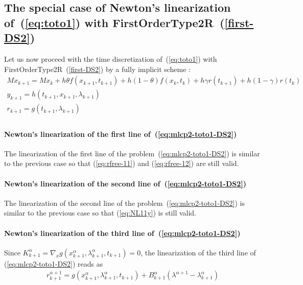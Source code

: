 

\subsection{The special case of Newton's linearization of~(\ref{eq:toto1}) with FirstOrderType2R~(\ref{first-DS2})} 


Let us now proceed with the time discretization of~(\ref{eq:toto1}) with FirstOrderType2R~(\ref{first-DS2})  by a fully implicit scheme : 
\begin{equation}
  \begin{array}{l}
    \label{eq:mlcp2-toto1-DS2}
     M x_{k+1} = M x_{k} +h\theta f(x_{k+1},t_{k+1})+h(1-\theta) f(x_k,t_k) + h \gamma r(t_{k+1})
     + h(1-\gamma)r(t_k)  \\[2mm]
     y_{k+1} =  h(t_{k+1},x_{k+1},\lambda _{k+1}) \\[2mm]
     r_{k+1} = g(t_{k+1},\lambda_{k+1})\\[2mm]
  \end{array}
\end{equation}


 \paragraph{Newton's linearization of the first line of~(\ref{eq:mlcp2-toto1-DS2})} The linearization of the first line of the  problem~(\ref{eq:mlcp2-toto1-DS2}) is similar to the previous case so that (\ref{eq:rfree-11}) and (\ref{eq:rfree-12}) are still valid.


 \paragraph{Newton's linearization of the second  line of~(\ref{eq:mlcp2-toto1-DS2})} The linearization of the second line of the  problem~(\ref{eq:mlcp2-toto1-DS2}) is similar to the previous case so that (\ref{eq:NL11y}) is still valid.

 \paragraph{Newton's linearization of the third  line of~(\ref{eq:mlcp2-toto1-DS2})}
Since $ K^{\alpha}_{k+1} = \nabla_xg(x^{\alpha}_{k+1},\lambda ^{\alpha}_{k+1},t_{k+1}) = 0 $, the linearization of the third line of (\ref{eq:mlcp2-toto1-DS2}) reads as
\begin{equation}
  \label{eq:mlcp2-rrL}
  \begin{array}{l}
    \boxed{r^{\alpha+1}_{k+1} = g(x ^{\alpha}_{k+1},\lambda ^{\alpha}_{k+1},t_{k+1})     + B^{\alpha}_{k+1} ( \lambda^{\alpha+1}-  \lambda^{\alpha}_{k+1} )}       
  \end{array}
\end{equation}


